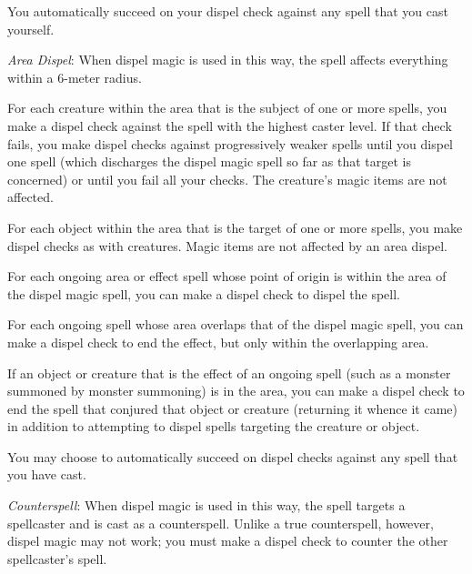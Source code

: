 {	You automatically succeed on your dispel check against any spell that you cast yourself.

	\textit{Area Dispel}:
	When dispel magic is used in this way, the spell affects everything within a 6-meter radius.

	For each creature within the area that is the subject of one or more spells, you make a dispel check against the spell with the highest caster level. If that check fails, you make dispel checks against progressively weaker spells until you dispel one spell (which discharges the dispel magic spell so far as that target is concerned) or until you fail all your checks. The creature's magic items are not affected.

	For each object within the area that is the target of one or more spells, you make dispel checks as with creatures. Magic items are not affected by an area dispel.

	For each ongoing area or effect spell whose point of origin is within the area of the dispel magic spell, you can make a dispel check to dispel the spell.

	For each ongoing spell whose area overlaps that of the dispel magic spell, you can make a dispel check to end the effect, but only within the overlapping area.

	If an object or creature that is the effect of an ongoing spell (such as a monster summoned by monster summoning) is in the area, you can make a dispel check to end the spell that conjured that object or creature (returning it whence it came) in addition to attempting to dispel spells targeting the creature or object.

	You may choose to automatically succeed on dispel checks against any spell that you have cast.

	\textit{Counterspell}:
	When dispel magic is used in this way, the spell targets a spellcaster and is cast as a counterspell. Unlike a true counterspell, however, dispel magic may not work; you must make a dispel check to counter the other spellcaster's spell.

}
